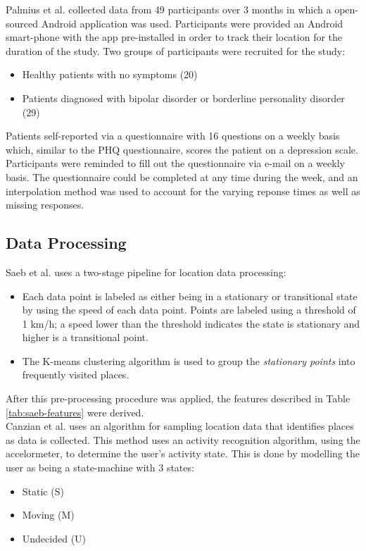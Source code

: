 Palmius et al. collected data from 49 participants over 3 months in which a open-sourced Android application was used. Participants were provided an Android smart-phone with the app pre-installed in order to track their location for the duration of the study. Two groups of participants were recruited for the study:

\begin{itemize}
    \item Healthy patients with no symptoms (20)
    \item Patients diagnosed with bipolar disorder or borderline personality disorder (29)
\end{itemize}

Patients self-reported via a questionnaire with 16 questions on a weekly basis which, similar to the PHQ questionnaire, scores the patient on a depression scale. Participants were reminded to fill out the questionnaire via e-mail on a weekly basis. The questionnaire could be completed at any time during the week, and an interpolation method was used to account for the varying reponse times as well as missing responses.

\subsection{Data Processing}
Saeb et al. uses a two-stage pipeline for location data processing: 
\begin{itemize}
    \item Each data point is labeled as either being in a stationary or transitional state by using the speed of each data point. Points are labeled using a threshold of 1 km/h; a speed lower than the threshold indicates the state is stationary and higher is a transitional point. 
    \item The K-means clustering algorithm is used to group the \textit{stationary points} into frequently visited places. 
\end{itemize}

After this pre-processing procedure was applied, the features described in Table \ref{tab:saeb-features} were derived.\\ 

Canzian et al. uses an algorithm for sampling location data that identifies places as data is collected. This method uses an activity recognition algorithm, using the accelormeter, to determine the user's activity state. This is done by modelling the user as being a state-machine with 3 states: 
\begin{itemize}
    \item Static (S)
    \item Moving (M)
    \item Undecided (U)
\end{itemize}


